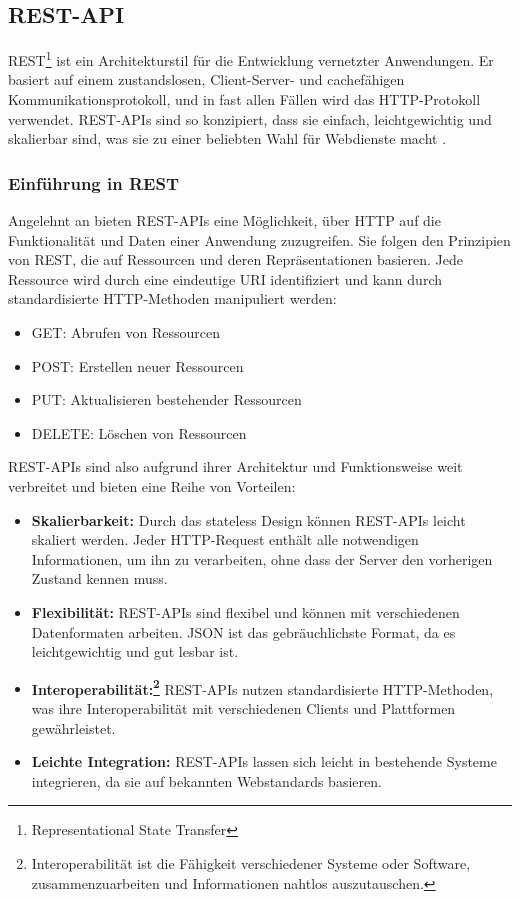 \subsection{REST-API}

REST\footnote{Representational State Transfer} ist ein Architekturstil für die Entwicklung vernetzter Anwendungen. Er basiert auf einem zustandslosen, Client-Server- und cachefähigen Kommunikationsprotokoll, und in fast allen Fällen wird das HTTP-Protokoll verwendet. REST-APIs sind so konzipiert, dass sie einfach, leichtgewichtig und skalierbar sind, was sie zu einer beliebten Wahl für Webdienste macht \cite{REST:2024}.

\subsubsection{Einführung in REST}
Angelehnt an \cite{REST:2024} bieten REST-APIs eine Möglichkeit, über HTTP auf die Funktionalität und Daten einer Anwendung zuzugreifen. Sie folgen den Prinzipien von REST, die auf Ressourcen und deren Repräsentationen basieren. Jede Ressource wird durch eine eindeutige URI identifiziert und kann durch standardisierte HTTP-Methoden manipuliert werden:
\begin{itemize}
	\item GET: Abrufen von Ressourcen
	\item POST: Erstellen neuer Ressourcen
	\item PUT: Aktualisieren bestehender Ressourcen
	\item DELETE: Löschen von Ressourcen
\end{itemize}

REST-APIs sind also aufgrund ihrer Architektur und Funktionsweise weit verbreitet und bieten eine Reihe von Vorteilen:

\begin{itemize}
	\item \textbf{Skalierbarkeit:} Durch das stateless Design können REST-APIs leicht skaliert werden. Jeder HTTP-Request enthält alle notwendigen Informationen, um ihn zu verarbeiten, ohne dass der Server den vorherigen Zustand kennen muss.
	\item \textbf{Flexibilität:} REST-APIs sind flexibel und können mit verschiedenen Datenformaten arbeiten. JSON ist das gebräuchlichste Format, da es leichtgewichtig und gut lesbar ist.
	\item \textbf{Interoperabilität:\footnote{Interoperabilität ist die Fähigkeit verschiedener Systeme oder Software, zusammenzuarbeiten und Informationen nahtlos auszutauschen\cite{wiki:listing}.}} REST-APIs nutzen standardisierte HTTP-Methoden, was ihre Interoperabilität mit verschiedenen Clients und Plattformen gewährleistet.
	\item \textbf{Leichte Integration:} REST-APIs lassen sich leicht in bestehende Systeme integrieren, da sie auf bekannten Webstandards basieren.
\end{itemize}

